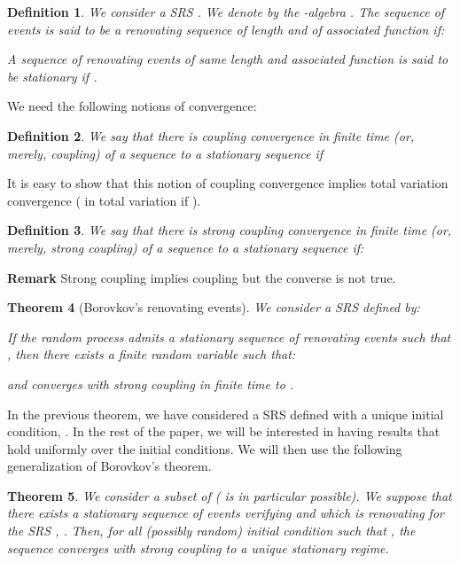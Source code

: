 \documentclass[11pt,titlepage]{article}
\newtheorem{theo}{Theorem }[section]
\newtheorem{defi}[theo]{Definition }
\begin{document}
\begin{defi}
We consider a SRS . We denote by  the
-algebra  . 
The sequence of events  is said to be a renovating sequence of length 
and of associated function  
 if:

A sequence 
of renovating events of same length and associated function is said to be
stationary if 
.
\end{defi}

We need the following notions of convergence:

\begin{defi}
We say that there is coupling convergence in finite time (or, merely,
coupling) of a sequence   	
to a stationary sequence  if

\end{defi}
It is easy to show that this notion of coupling convergence implies total
variation convergence 
( in total variation if ).       
                          
\begin{defi}
We say that there is strong coupling convergence in finite time (or, merely,
strong coupling) of a sequence 
to a stationary sequence  if:

\label{scoup}
\end{defi}
{\bf Remark } Strong coupling implies coupling but the converse is not true.

\begin{theo}[Borovkov's renovating events]
\label{thbo1}
We consider a SRS
 defined by:

If the random process  admits a stationary sequence of
renovating events  
 such that , then there exists a finite random variable  such that:

and  converges with strong coupling in finite time to . 
\end{theo} 




In the previous theorem, we have considered a SRS defined with a unique
initial condition, . In the rest of 
the paper, we will be interested in having results that hold uniformly over
the initial 
conditions. We will then use the 
following generalization of Borovkov's theorem.

\begin{theo}
\label{thbo2}
We consider a subset  of  ( is in particular possible).
We suppose that  there exists a stationary sequence of 
events  verifying  and which is renovating
for the SRS ,  
. 
Then, for all (possibly random) initial condition 
 such that , the sequence  
converges with strong coupling to a unique stationary 
regime.
\end{theo}
\end{document}
